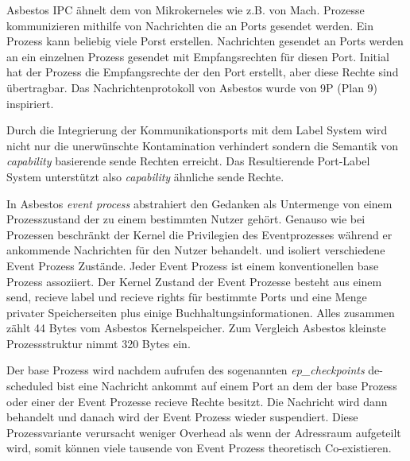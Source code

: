 \documentclass[9pt,technote]{IEEEtran}
\begin{document}
      Asbestos IPC \"ahnelt dem von Mikrokerneles wie z.B. von Mach. Prozesse kommunizieren mithilfe von Nachrichten die an Ports gesendet werden. Ein Prozess kann
      beliebig viele Porst erstellen. Nachrichten gesendet an Ports werden an ein einzelnen Prozess gesendet mit Empfangsrechten f\"ur diesen Port. Initial hat der Prozess
      die Empfangsrechte der den Port erstellt, aber diese Rechte sind \"ubertragbar. Das Nachrichtenprotokoll von Asbestos wurde von 9P (Plan 9) inspiriert.
      
      
      Durch die Integrierung der Kommunikationsports mit dem Label System wird nicht nur die unerw\"unschte Kontamination verhindert sondern die Semantik von \textit{capability} basierende
      sende Rechten erreicht. Das Resultierende Port-Label System unterst\"utzt also \textit{capability} \"ahnliche sende Rechte.
      
      In Asbestos \textit{event process} abstrahiert den Gedanken als Untermenge von einem Prozesszustand der zu einem bestimmten Nutzer geh\"ort. Genauso wie bei Prozessen beschr\"ankt der Kernel
      die Privilegien des Eventprozesses w\"ahrend er ankommende Nachrichten f\"ur den Nutzer behandelt. und isoliert verschiedene Event Prozess Zust\"ande.
      Jeder Event Prozess ist einem konventionellen base Prozess assoziiert. Der Kernel Zustand der Event Prozesse besteht aus einem send, recieve label und recieve rights f\"ur bestimmte Ports
      und eine Menge privater Speicherseiten plus einige Buchhaltungsinformationen. Alles zusammen z\"ahlt 44 Bytes vom Asbestos Kernelspeicher. Zum Vergleich Asbestos kleinste Prozessstruktur
      nimmt 320 Bytes ein. 
      
      Der base Prozess wird nachdem aufrufen des sogenannten \textit{ep\_checkpoints} de-scheduled bist eine Nachricht ankommt auf einem Port an dem der base Prozess oder einer der
      Event Prozesse recieve Rechte besitzt. Die Nachricht wird dann behandelt und danach wird der Event Prozess wieder suspendiert.
      Diese Prozessvariante verursacht weniger Overhead als wenn der Adressraum aufgeteilt wird, somit k\"onnen viele tausende von Event Prozess theoretisch Co-existieren.
      
     
        
%   
    
\end{document}

